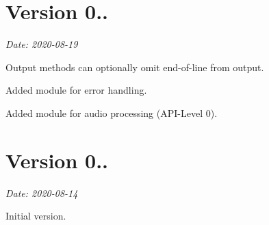 \section*{Version 0..}

{\itshape Date\+: 2020-\/08-\/19}


\begin{DoxyItemize}
\item Output methods can optionally omit end-\/of-\/line from output.
\item Added module for error handling.
\item Added module for audio processing (A\+P\+I-\/\+Level 0).
\end{DoxyItemize}

\section*{Version 0..}

{\itshape Date\+: 2020-\/08-\/14}


\begin{DoxyItemize}
\item Initial version. 
\end{DoxyItemize}